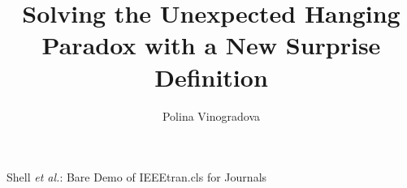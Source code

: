 \documentclass[journal]{journal}
\begin{document}
%
\title{Solving the Unexpected Hanging Paradox with a New Surprise Definition}
%
%
%

\author{Polina Vinogradova}%

%
%



%
{Shell \MakeLowercase{\textit{et al.}}: Bare Demo of IEEEtran.cls for Journals}
%




\end{document}
